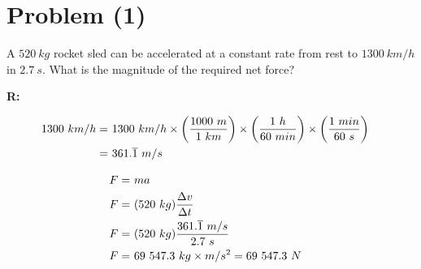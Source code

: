 \section{Problem (1)}
	A $520 \ kg$ rocket sled can be accelerated at a constant rate from rest to $1300 \ km/h$ in $2.7 \ s$. What is the magnitude of the required net force?

	\textbf{R:} \newline

	\begin{align}
		1300 \ km/h = \ &1300 \ km/h
		\times \left( \frac{1000 \ m}{1 \ km} \right)
		\times \left( \frac{1 \ h}{60 \ min} \right)
		\times \left( \frac{1 \ min}{60 \ s} \right)& \notag \\
		= \ &361.\overline{1} \ m/s& \notag
	\end{align}

	\begin{align}
		F = \ &ma& \notag \\
		F = \ &(520 \ kg)\frac{\Delta v}{\Delta t}& \notag \\
		F = \ &(520 \ kg)\frac{361.\overline{1} \ m/s}{2.7 \ s}& \notag \\
		F = \ &69 \ 547.3 \ kg \times m/s^{2} = 69 \ 547.3 \ N&
	\end{align}
